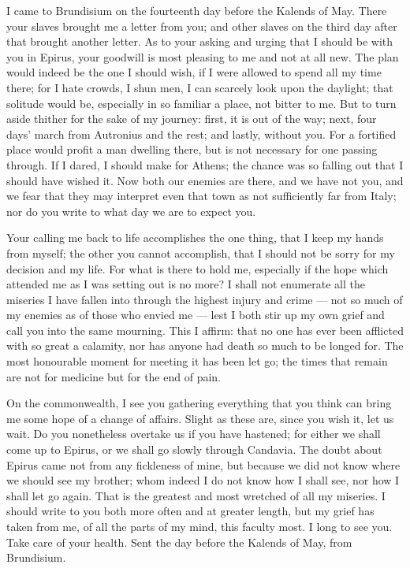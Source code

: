

 I came to Brundisium on the fourteenth day before the Kalends of May. There your slaves brought me a letter from you; and other slaves on the third day after that brought another letter. As to your asking and urging that I should be with you in Epirus, your goodwill is most pleasing to me and not at all new. The plan would indeed be the one I should wish, if I were allowed to spend all my time there; for I hate crowds, I shun men, I can scarcely look upon the daylight; that solitude would be, especially in so familiar a place, not bitter to me. But to turn aside thither for the sake of my journey: first, it is out of the way; next, four days' march from Autronius and the rest; and lastly, without you. For a fortified place would profit a man dwelling there, but is not necessary for one passing through. If I dared, I should make for Athens; the chance was so falling out that I should have wished it. Now both our enemies are there, and we have not you, and we fear that they may interpret even that town as not sufficiently far from Italy; nor do you write to what day we are to expect you.

 Your calling me back to life accomplishes the one thing, that I keep my hands from myself; the other you cannot accomplish, that I should not be sorry for my decision and my life. For what is there to hold me, especially if the hope which attended me as I was setting out is no more? I shall not enumerate all the miseries I have fallen into through the highest injury and crime --- not so much of my enemies as of those who envied me --- lest I both stir up my own grief and call you into the same mourning. This I affirm: that no one has ever been afflicted with so great a calamity, nor has anyone had death so much to be longed for. The most honourable moment for meeting it has been let go; the times that remain are not for medicine but for the end of pain.

 On the commonwealth, I see you gathering everything that you think can bring me some hope of a change of affairs. Slight as these are, since you wish it, let us wait. Do you nonetheless overtake us if you have hastened; for either we shall come up to Epirus, or we shall go slowly through Candavia. The doubt about Epirus came not from any fickleness of mine, but because we did not know where we should see my brother; whom indeed I do not know how I shall see, nor how I shall let go again. That is the greatest and most wretched of all my miseries. I should write to you both more often and at greater length, but my grief has taken from me, of all the parts of my mind, this faculty most. I long to see you. Take care of your health. Sent the day before the Kalends of May, from Brundisium.
